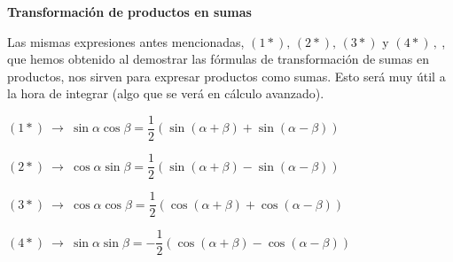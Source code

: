 \vspace{10mm} \begin{large}
 \textbf{Transformación de productos en sumas}	
 \end{large}
 
 Las mismas expresiones antes mencionadas,  $(1*),\, (2*),\, (3*) \text{ y }  
 (4*)\, , \ $, que hemos obtenido al demostrar las fórmulas de transformación de sumas en productos, nos sirven para expresar productos como sumas. Esto será muy útil a la hora de integrar (algo que se verá en cálculo avanzado).



\vspace{5mm}

\begin{adjustwidth}{100pt}{75pt}
\begin{destacado}
$(1*) \ \to \ \sin\alpha \cos \beta = \dfrac 1 2 \left( \sin(\alpha+\beta)+\sin(\alpha-\beta) \right)$

$(2*) \ \to \ \cos\alpha \sin \beta  =\dfrac 1 2 \left(  \sin(\alpha+\beta)-\sin(\alpha-\beta) \right)$

$(3*) \ \to \ \cos\alpha \cos \beta =\dfrac 1 2 \left(  \cos(\alpha+\beta)+\cos(\alpha-\beta) \right)$

$(4*) \ \to \ \sin\alpha \sin \beta =-\dfrac 1 2 \left(   \cos(\alpha+\beta)-\cos (\alpha-\beta) \right)$
\end{destacado}
\end{adjustwidth}


